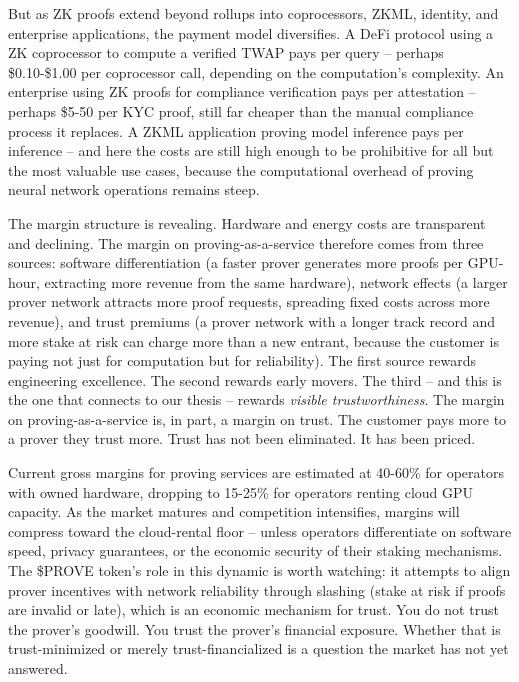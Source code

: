 \documentclass[
  11pt,
  openany]{report}
\begin{document}
But as ZK proofs extend beyond rollups into coprocessors, ZKML, identity, and
enterprise applications, the payment model diversifies. A DeFi protocol using a
ZK coprocessor to compute a verified TWAP pays per query -- perhaps
\$0.10-\$1.00 per coprocessor call, depending on the computation's complexity.
An enterprise using ZK proofs for compliance verification pays per attestation
-- perhaps \$5-50 per KYC proof, still far cheaper than the manual compliance
process it replaces. A ZKML application proving model inference pays per
inference -- and here the costs are still high enough to be prohibitive for all
but the most valuable use cases, because the computational overhead of proving
neural network operations remains steep.

The margin structure is revealing. Hardware and energy costs are transparent and
declining. The margin on proving-as-a-service therefore comes from three
sources: software differentiation (a faster prover generates more proofs per
GPU-hour, extracting more revenue from the same hardware), network effects (a
larger prover network attracts more proof requests, spreading fixed costs across
more revenue), and trust premiums (a prover network with a longer track record
and more stake at risk can charge more than a new entrant, because the customer
is paying not just for computation but for reliability). The first source
rewards engineering excellence. The second rewards early movers. The third --
and this is the one that connects to our thesis -- rewards \emph{visible
trustworthiness}. The margin on proving-as-a-service is, in part, a margin on
trust. The customer pays more to a prover they trust more. Trust has not been
eliminated. It has been priced.

Current gross margins for proving services are estimated at 40-60\% for
operators with owned hardware, dropping to 15-25\% for operators renting cloud
GPU capacity. As the market matures and competition intensifies, margins will
compress toward the cloud-rental floor -- unless operators differentiate on
software speed, privacy guarantees, or the economic security of their staking
mechanisms. The \$PROVE token's role in this dynamic is worth watching: it
attempts to align prover incentives with network reliability through slashing
(stake at risk if proofs are invalid or late), which is an economic mechanism
for trust. You do not trust the prover's goodwill. You trust the prover's
financial exposure. Whether that is trust-minimized or merely
trust-financialized is a question the market has not yet answered.
\end{document}
